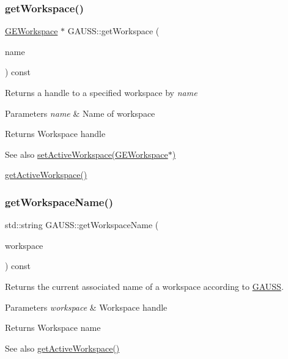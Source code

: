 \subsubsection{\texorpdfstring{get\+Workspace()}{getWorkspace()}}
{\footnotesize\ttfamily \hyperlink{class_g_e_workspace}{G\+E\+Workspace} $\ast$ G\+A\+U\+S\+S\+::get\+Workspace (\begin{DoxyParamCaption}\item[{std\+::string}]{name }\end{DoxyParamCaption}) const}



Returns a handle to a specified workspace by {\itshape name} 


\begin{DoxyParams}{Parameters}
{\em name} & Name of workspace \\
\hline
\end{DoxyParams}
\begin{DoxyReturn}{Returns}
Workspace handle
\end{DoxyReturn}
\begin{DoxySeeAlso}{See also}
\hyperlink{class_g_a_u_s_s_a6b94adbb7ad799f1e025cd4d7f08f75b}{set\+Active\+Workspace(\+G\+E\+Workspace$\ast$)} 

\hyperlink{class_g_a_u_s_s_a34f3cc44cd296cc326ced670d2ac6a59}{get\+Active\+Workspace()} 
\end{DoxySeeAlso}
\mbox{\label{class_g_a_u_s_s_a67fd29c51a61b6f99e01dc0dc94f36c2}} 
\subsubsection{\texorpdfstring{get\+Workspace\+Name()}{getWorkspaceName()}}
{\footnotesize\ttfamily std\+::string G\+A\+U\+S\+S\+::get\+Workspace\+Name (\begin{DoxyParamCaption}\item[{\hyperlink{class_g_e_workspace}{G\+E\+Workspace} $\ast$}]{workspace }\end{DoxyParamCaption}) const}



Returns the current associated name of a workspace according to \hyperlink{class_g_a_u_s_s}{G\+A\+U\+SS}. 


\begin{DoxyParams}{Parameters}
{\em workspace} & Workspace handle \\
\hline
\end{DoxyParams}
\begin{DoxyReturn}{Returns}
Workspace name
\end{DoxyReturn}
\begin{DoxySeeAlso}{See also}
\hyperlink{class_g_a_u_s_s_a34f3cc44cd296cc326ced670d2ac6a59}{get\+Active\+Workspace()} 
\end{DoxySeeAlso}
\mbox{\label{class_g_a_u_s_s_aad9f7a3a527b9c5961d1cc1b1aa9066c}} 
